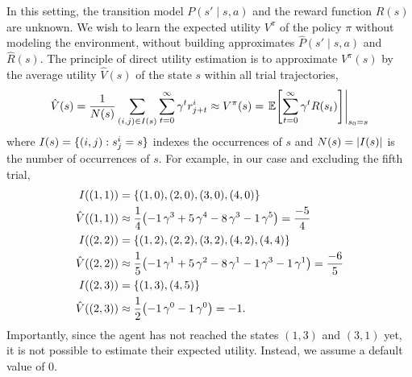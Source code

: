 \documentclass[11pt, a4paper]{exam}
\begin{document}
\begin{exercises}
\begin{parts}
    \begin{solution}
        In this setting, the transition model $P(s' \mid s, a)$ and the reward function $R(s)$ are unknown. We wish to learn the expected utility $V^\pi$ of the policy $\pi$ without modeling the environment, \ie{} without building approximates $\hat{P}(s' \mid s, a)$ and $\hat{R}(s)$. The principle of direct utility estimation is to approximate $V^\pi(s)$ by the average utility $\hat{V}(s)$ of the state $s$ within all trial trajectories, \ie{}
        \begin{equation*}
            \hat{V}(s) = \frac{1}{N(s)} \sum_{(i, j) \in I(s)} \sum_{t = 0}^{\infty} \gamma^t r^i_{j + t} \approx V^\pi(s) = \left. \E \sbk*{\sum_{t = 0}^{\infty} \gamma^t R(s_t)} \right|_{s_0 = s}
        \end{equation*}
        where $I(s) = \{(i, j): s^i_j = s\}$ indexes the occurrences of $s$ and $N(s) = \lvert I(s)\rvert$ is the number of occurrences of $s$. For example, in our case and excluding the fifth trial,
        \begin{align*}
            I((1, 1)) & = \cbk{(1, 0), (2, 0), (3, 0), (4, 0)} \\
            \hat{V}((1, 1)) & \approx \frac{1}{4} \rbk*{- 1 \, \gamma^3 + 5 \, \gamma^4 - 8 \, \gamma^3 - 1 \, \gamma^5} = \frac{-5}{4} \\
            I((2, 2)) & = \cbk{(1, 2), (2, 2), (3, 2), (4, 2), (4, 4)} \\
            \hat{V}((2, 2)) & \approx \frac{1}{5} \rbk*{- 1 \, \gamma^1 + 5 \, \gamma^2 - 8 \, \gamma^1 - 1 \, \gamma^3 - 1 \, \gamma^1} = \frac{-6}{5} \\
            I((2, 3)) & = \cbk{(1, 3), (4, 5)} \\
            \hat{V}((2, 3)) & \approx \frac{1}{2} \rbk*{- 1 \, \gamma^0 - 1 \, \gamma^0} = -1 .
        \end{align*}
        Importantly, since the agent has not reached the states $(1, 3)$ and $(3, 1)$ yet, it is not possible to estimate their expected utility. Instead, we assume a default value of $0$.


\end{solution}
\end{parts}
\end{exercises}
\end{document}

